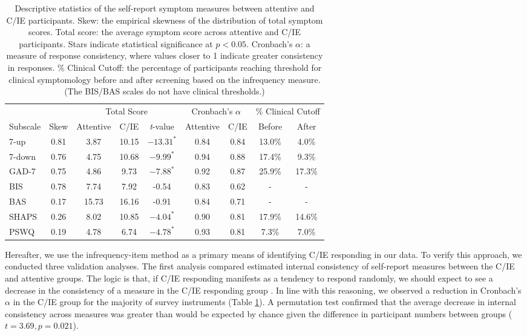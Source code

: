 \documentclass[a4paper,notitlepage,12pt]{article}
\begin{document}
\begin{refsection}[main]
\begin{table}[!t]
\centering
\small
\setlength{\tabcolsep}{6pt}
\begin{tabular}{lcccccccc}
\toprule
& & \multicolumn{3}{c}{Total Score} & \multicolumn{2}{c}{Cronbach's $\alpha$} & \multicolumn{2}{c}{\% Clinical Cutoff} \\
\cmidrule(lr){3-5} \cmidrule(lr){6-7} \cmidrule(lr){8-9}
 Subscale & Skew & Attentive & C/IE & \textit{t}-value & Attentive & C/IE & Before & After \\
\midrule
7-up   &  0.81 &    3.87 &   10.15 &  $-13.31^*$ &    0.84 &    0.84 &     13.0\% &       4.0\% \\
7-down &  0.76 &    4.75 &   10.68 &   $-9.99^*$ &    0.94 &    0.88 &     17.4\% &       9.3\% \\
GAD-7  &  0.75 &    4.86 &    9.73 &   $-7.88^*$ &    0.92 &    0.87 &     25.9\% &      17.3\% \\
BIS    &  0.78 &    7.74 &    7.92 &   -0.54 &    0.83 &    0.62 &        - &             - \\
BAS    &  0.17 &   15.73 &   16.16 &   -0.91 &    0.84 &    0.71 &        - &             - \\
SHAPS  &  0.26 &    8.02 &   10.85 &   $-4.04^*$ &    0.90 &    0.81 &     17.9\% &      14.6\% \\
PSWQ   &  0.19 &    4.78 &    6.74 &   $-4.78^*$ &    0.93 &    0.81 &      7.3\% &       7.0\% \\
\bottomrule
\end{tabular}
\captionsetup{width=0.88\textwidth}
\caption{Descriptive statistics of the self-report symptom measures between attentive and C/IE participants. Skew: the empirical skewness of the distribution of total symptom scores. Total score: the average symptom score across attentive and C/IE participants. Stars indicate statistical significance at $p<0.05$. Cronbach's $\alpha$: a measure of response consistency, where values closer to 1 indicate greater consistency in responses. \% Clinical Cutoff: the percentage of participants reaching threshold for clinical symptomology before and after screening based on the infrequency measure. (The BIS/BAS scales do not have clinical thresholds.)}
\label{tab:validation}
\end{table}

Hereafter, we use the infrequency-item method as a primary means of identifying C/IE responding in our data. To verify this approach, we conducted three validation analyses. The first analysis compared estimated internal consistency of self-report measures between the C/IE and attentive groups. The logic is that, if C/IE responding manifests as a tendency to respond randomly, we should expect to see a decrease in the consistency of a measure in the C/IE responding group \cite{maniaci2014caring, desimone2018dirty, desimone2018differential}. In line with this reasoning, we observed a reduction in Cronbach's $\alpha$ in the C/IE group for the majority of survey instruments (Table \ref{tab:validation}). A permutation test confirmed that the average decrease in internal consistency across measures was greater than would be expected by chance given the difference in participant numbers between groups ($t = 3.69, p = 0.021$). 


\end{refsection}
\end{document}
